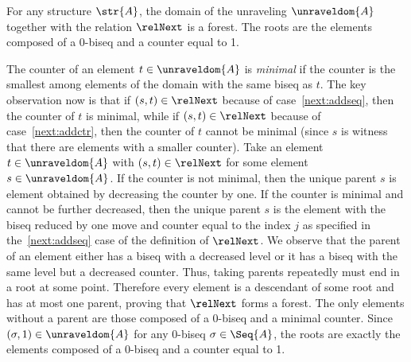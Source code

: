 \begin{lemma}
  For any structure $\str{A}$, the domain of the unraveling $\unraveldom{A}$ together with the relation $\relNext$ is a forest. The roots are the elements composed of a 0-biseq and a counter equal to 1.
\end{lemma}
\begin{proofsketch}
  The counter of an element $t \in \unraveldom{A}$ is \emph{minimal} if the counter is the smallest among elements of the domain with the same biseq as $t$.
  The key observation now is that if $(s,t) \in \relNext$ because of case~\ref{next:addseq}, then the counter of $t$ is minimal, while if $(s,t) \in \relNext$ because of case~\ref{next:addctr}, then the counter of $t$ cannot be minimal (since $s$ is witness that there are elements with a smaller counter).
  Take an element $t \in \unraveldom{A}$ with $(s, t) \in \relNext$ for some element $s \in \unraveldom{A}$.
  If the counter is not minimal, then the unique parent $s$ is element obtained by decreasing the counter by one.
  If the counter is minimal and cannot be further decreased, then the unique parent $s$ is the element with the biseq reduced by one move and counter equal to the index $j$ as specified in the~\ref{next:addseq} case of the definition of $\relNext$.
  We observe that the parent of an element either has a biseq with a decreased level or it has a biseq with the same level but a decreased counter.
  Thus, taking parents repeatedly must end in a root at some point.
  Therefore every element is a descendant of some root and has at most one parent, proving that $\relNext$ forms a forest.
  The only elements without a parent are those composed of a 0-biseq and a minimal counter.
  Since $(\sigma, 1) \in \unraveldom{A}$ for any 0-biseq $\sigma \in \Seq{A}$, the roots are exactly the elements composed of a 0-biseq and a counter equal to 1.
\end{proofsketch}

